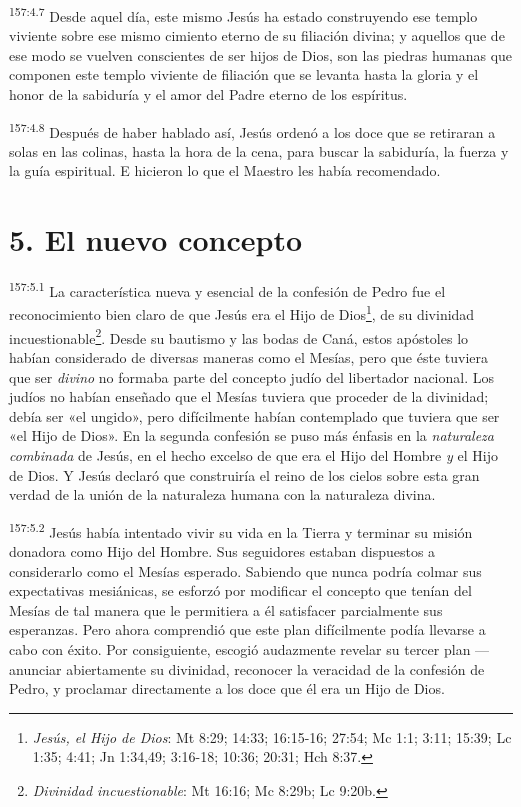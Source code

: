 \par
\textsuperscript{157:4.7} Desde aquel día, este mismo Jesús ha estado construyendo ese templo viviente sobre ese mismo cimiento eterno de su filiación divina; y aquellos que de ese modo se vuelven conscientes de ser hijos de Dios, son las piedras humanas que componen este templo viviente de filiación que se levanta hasta la gloria y el honor de la sabiduría y el amor del Padre eterno de los espíritus.

\par
\textsuperscript{157:4.8} Después de haber hablado así, Jesús ordenó a los doce que se retiraran a solas en las colinas, hasta la hora de la cena, para buscar la sabiduría, la fuerza y la guía espiritual. E hicieron lo que el Maestro les había recomendado.

\section*{5. El nuevo concepto}
\par
\textsuperscript{157:5.1} La característica nueva y esencial de la confesión de Pedro fue el reconocimiento bien claro de que Jesús era el Hijo de Dios\footnote{\textit{Jesús, el Hijo de Dios}: Mt 8:29; 14:33; 16:15-16; 27:54; Mc 1:1; 3:11; 15:39; Lc 1:35; 4:41; Jn 1:34,49; 3:16-18; 10:36; 20:31; Hch 8:37.}, de su divinidad incuestionable\footnote{\textit{Divinidad incuestionable}: Mt 16:16; Mc 8:29b; Lc 9:20b.}. Desde su bautismo y las bodas de Caná, estos apóstoles lo habían considerado de diversas maneras como el Mesías, pero que éste tuviera que ser \textit{divino} no formaba parte del concepto judío del libertador nacional. Los judíos no habían enseñado que el Mesías tuviera que proceder de la divinidad; debía ser «el ungido», pero difícilmente habían contemplado que tuviera que ser «el Hijo de Dios». En la segunda confesión se puso más énfasis en la \textit{naturaleza} \textit{combinada} de Jesús, en el hecho excelso de que era el Hijo del Hombre \textit{y} el Hijo de Dios. Y Jesús declaró que construiría el reino de los cielos sobre esta gran verdad de la unión de la naturaleza humana con la naturaleza divina.

\par
\textsuperscript{157:5.2} Jesús había intentado vivir su vida en la Tierra y terminar su misión donadora como Hijo del Hombre. Sus seguidores estaban dispuestos a considerarlo como el Mesías esperado. Sabiendo que nunca podría colmar sus expectativas mesiánicas, se esforzó por modificar el concepto que tenían del Mesías de tal manera que le permitiera a él satisfacer parcialmente sus esperanzas. Pero ahora comprendió que este plan difícilmente podía llevarse a cabo con éxito. Por consiguiente, escogió audazmente revelar su tercer plan ---anunciar abiertamente su divinidad, reconocer la veracidad de la confesión de Pedro, y proclamar directamente a los doce que él era un Hijo de Dios.

